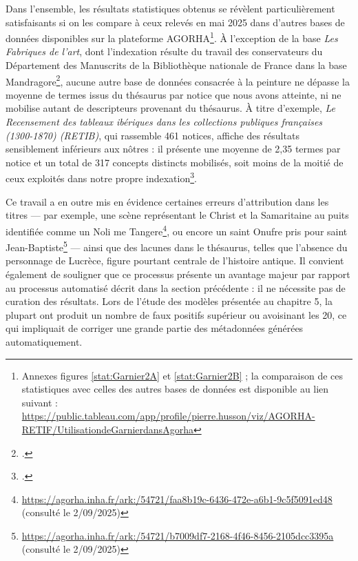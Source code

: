 Dans l’ensemble, les résultats statistiques obtenus se révèlent particulièrement satisfaisants si on les compare à ceux relevés en mai 2025 dans d’autres bases de données disponibles sur la plateforme AGORHA\footnote{Annexes figures \ref{stat:Garnier2A} et \ref{stat:Garnier2B} ; la comparaison de ces statistiques avec celles des autres bases de données est disponible au lien suivant : \url{https://public.tableau.com/app/profile/pierre.husson/viz/AGORHA-RETIF/UtilisationdeGarnierdansAgorha}}. À l’exception de la base \textit{Les Fabriques de l’art}, dont l’indexation résulte du travail des conservateurs du Département des Manuscrits de la Bibliothèque nationale de France dans la base Mandragore\footcite{institutnationaldhistoiredelartFabriqueLartCouleurs}, aucune autre base de données consacrée à la peinture ne dépasse la moyenne de termes issus du thésaurus par notice que nous avons atteinte, ni ne mobilise autant de descripteurs provenant du thésaurus. À titre d’exemple, \textit{Le Recensement des tableaux ibériques dans les collections publiques françaises (1300-1870) (RETIB)}, qui rassemble 461 notices, affiche des résultats sensiblement inférieurs aux nôtres : il présente une moyenne de 2,35 termes par notice et un total de 317 concepts distincts mobilisés, soit moins de la moitié de ceux exploités dans notre propre indexation\footcite{institutnationaldhistoiredelartRecensementTableauxIberiques}.

Ce travail a en outre mis en évidence certaines erreurs d’attribution dans les titres — par exemple, une scène représentant le Christ et la Samaritaine au puits identifiée comme un Noli me Tangere\footnote{\url{https://agorha.inha.fr/ark:/54721/faa8b19c-6436-472e-a6b1-9c5f5091ed48} (consulté le 2/09/2025)}, ou encore un saint Onufre pris pour saint Jean-Baptiste\footnote{\url{https://agorha.inha.fr/ark:/54721/b7009df7-2168-4f46-8456-2105dcc3395a} (consulté le 2/09/2025)} — ainsi que des lacunes dans le thésaurus, telles que l’absence du personnage de Lucrèce, figure pourtant centrale de l’histoire antique. Il convient également de souligner que ce processus présente un avantage majeur par rapport au processus automatisé décrit dans la section précédente : il ne nécessite pas de curation des résultats. Lors de l’étude des modèles présentée au chapitre 5, la plupart ont produit un nombre de faux positifs supérieur ou avoisinant les 20, ce qui impliquait de corriger une grande partie des métadonnées générées automatiquement.

